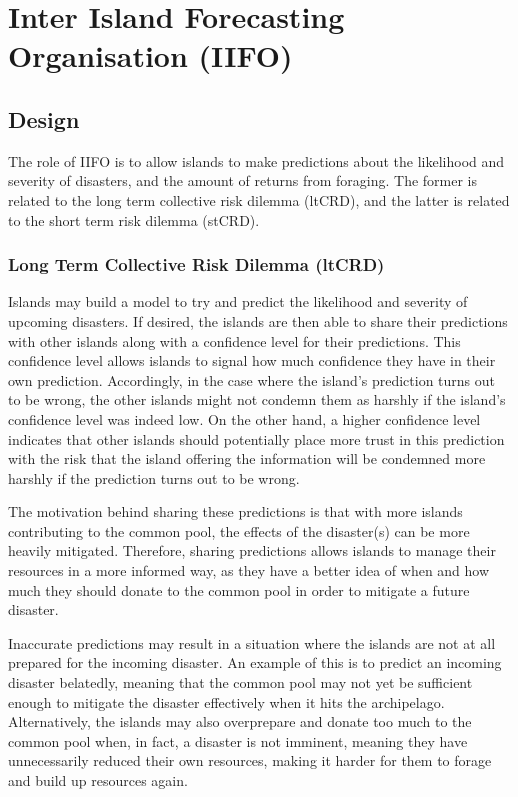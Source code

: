 \chapter{Inter Island Forecasting Organisation (IIFO)}

\section{Design}
The role of IIFO is to allow islands to make predictions about the likelihood and severity of disasters, and the amount of returns from foraging. The former is related to the long term collective risk dilemma (ltCRD), and the latter is related to the short term risk dilemma (stCRD).
\subsection{Long Term Collective Risk Dilemma (ltCRD)}
\label{subsec:IIFO:ltCRD}

Islands may build a model to try and predict the likelihood and severity of upcoming disasters. If desired, the islands are then able to share their predictions with other islands along with a confidence level for their predictions. This confidence level allows islands to signal how much confidence they have in their own prediction. Accordingly, in the case where the island's prediction turns out to be wrong, the other islands might not condemn them as harshly if the island's confidence level was indeed low. On the other hand, a higher confidence level indicates that other islands should potentially place more trust in this prediction with the risk that the island offering the information will be condemned more harshly if the prediction turns out to be wrong.

The motivation behind sharing these predictions is that with more islands contributing to the common pool, the effects of the disaster(s) can be more heavily mitigated. Therefore, sharing predictions allows islands to manage their resources in a more informed way, as they have a better idea of when and how much they should donate to the common pool in order to mitigate a future disaster.

Inaccurate predictions may result in a situation where the islands are not at all prepared for the incoming disaster. An example of this is to predict an incoming disaster belatedly, meaning that the common pool may not yet be sufficient enough to mitigate the disaster effectively when it hits the archipelago. Alternatively, the islands may also overprepare and donate too much to the common pool when, in fact, a disaster is not imminent, meaning they have unnecessarily reduced their own resources, making it harder for them to forage and build up resources again.
